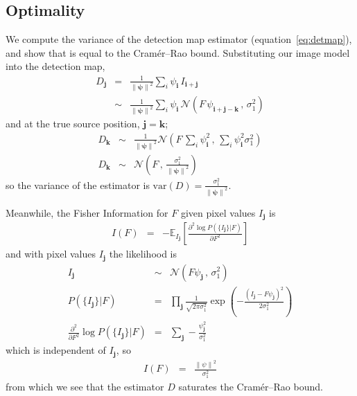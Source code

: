 \documentclass[11pt,letterpaper,linenumbers]{aastex63}
\newcommand{\equationname}{equation}
\newcommand{\eqnref}[1]{\mbox{\equationname~\ref{#1}}}
\newcommand{\drawnfrom}{\sim}
\newcommand{\gaussianN}{\mathcal{N}}
\newcommand{\gaussx}[2]{\gaussianN\!\left(#1 \, , \, #2\right)}
\newcommand{\psf}{\psi}
\newcommand{\psfat}[1]{\psf_{#1}}
\newcommand{\psfnorm}{\norm{\bm{\psf}}}
\newcommand{\norm}[1]{\left\lVert #1 \right\rVert}
\newcommand{\var}[1]{\mathrm{var}\left( #1 \right)}
\renewcommand{\vec}[1]{\boldsymbol{#1}}
\newcommand{\ivec}{\vec{i}}
\newcommand{\jvec}{\vec{j}}
\newcommand{\kvec}{\vec{k}}
\begin{document}
\subsection{Optimality}
\label{sec:optsingle}

We compute the variance of the detection map estimator
(\eqnref{eq:detmap}), and show that is equal to the Cram\'er--Rao
bound.  Substituting our image model into the detection map,
\begin{eqnarray}
D_{\jvec} &=& \frac{1}{\psfnorm^2} \sum_{i} \psfat{\ivec} \,
I_{\ivec + \jvec}
\\
& \drawnfrom & \frac{1}{\psfnorm^2} \sum_{i} \psfat{\ivec} \,
\gaussx{F \, \psfat{\ivec + \jvec - \kvec}}{\sigma_1^2}
\end{eqnarray}
and at the true source position, $\jvec = \kvec$;
\begin{eqnarray}
%
D_{\kvec} &\drawnfrom& \frac{1}{\psfnorm^2} \gaussx%
{F \, \sum_{i} \psfat{\ivec}^2}%
{\sum_{i} \psfat{\ivec}^2 \sigma_1^2}
\\
D_{\kvec} &\drawnfrom& \gaussx%
{F}{\frac{\sigma_1^2}{\psfnorm^2}}
\end{eqnarray}
so the variance of the estimator is $\var{D} = \frac{\sigma_1^2}{\psfnorm^2}$.

Meanwhile, the Fisher Information for $F$ given pixel values $I_{\jvec}$ is
\begin{eqnarray}
  I(F) &=& -\mathbb{E}_{I_{\jvec}} \left[ \frac{\partial^2 \log P(\{ I_{\jvec} \} | F)}{\partial F^2} \right]
\end{eqnarray}
and with pixel values $I_{\jvec}$ the likelihood is
\begin{eqnarray}
  I_{\jvec} &\drawnfrom& \gaussx{F \psf_{\jvec}}{\sigma_1^2} \\
  P(\{ I_{\jvec} \} | F) &=& \prod_{\jvec} \frac{1}{\sqrt{2 \pi \sigma_1^2}} \exp \left( -\frac{(I_{\jvec} - F \psf_{\jvec})^2}{2 \sigma_1^2} \right) \\
  \frac{\partial^2}{\partial F^2} \log P(\{ I_{\jvec} \} | F) &=& \sum_{\jvec} -\frac{\psf_{\jvec}^2}{\sigma_1^2}
\end{eqnarray}
which is independent of $I_{\jvec}$, so
\begin{eqnarray}
  I(F) &=& \frac{\norm{\psf}^2}{\sigma_1^2}
\end{eqnarray}
from which we see that the estimator $D$ saturates the Cram\'er--Rao bound.
\end{document}
